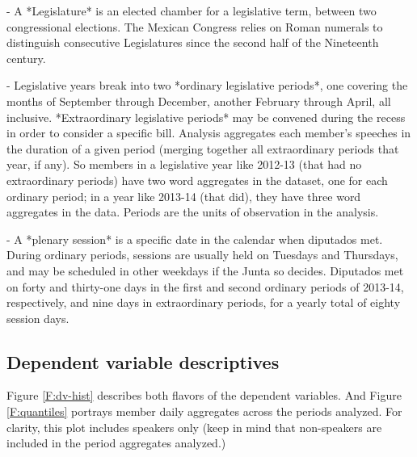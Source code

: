 \documentclass[letter,12pt]{article}
\begin{document}
- A *Legislature* is an elected chamber for a legislative term, between two congressional elections. The Mexican Congress relies on Roman numerals to distinguish consecutive Legislatures since the second half of the Nineteenth century.

- Legislative years break into two *ordinary legislative periods*, one covering the months of September through December, another February through April, all inclusive. *Extraordinary legislative periods* may be convened during the recess in order to consider a specific bill. Analysis aggregates each member's speeches in the duration of a given period (merging together all extraordinary periods that year, if any). So members in a legislative year like 2012-13 (that had no extraordinary periods) have two word aggregates in the dataset, one for each ordinary period; in a year like 2013-14 (that did), they have three word aggregates in the data. Periods are the units of observation in the analysis. 

- A *plenary session* is a specific date in the calendar when diputados met. During ordinary periods, sessions are usually held on Tuesdays and Thursdays, and may be scheduled in other weekdays if the Junta so decides. Diputados met on forty and thirty-one days in the first and second ordinary periods of 2013-14, respectively, and nine days in extraordinary periods, for a yearly total of eighty session days.

\subsection{Dependent variable descriptives}

Figure \ref{F:dv-hist} describes both flavors of the dependent variables. And Figure \ref{F:quantiles} portrays member daily aggregates across the periods analyzed. For clarity, this plot includes speakers only (keep in mind that non-speakers are included in the period aggregates analyzed.)
\end{document}
